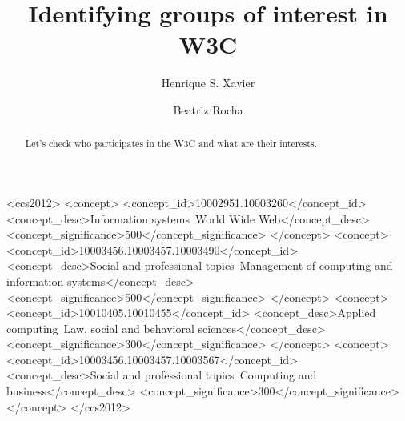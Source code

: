 \documentclass[sigconf, nonacm]{acmart}              %
\begin{document}
\title{Identifying groups of interest in W3C}

\author{Henrique S. Xavier}
\author{Beatriz Rocha}


\renewcommand{\shortauthors}{H. S. Xavier}

\begin{abstract}

Let's check who participates in the W3C and what are their interests.
  
\end{abstract}

\begin{CCSXML}
<ccs2012>
   <concept>
       <concept_id>10002951.10003260</concept_id>
       <concept_desc>Information systems~World Wide Web</concept_desc>
       <concept_significance>500</concept_significance>
       </concept>
   <concept>
       <concept_id>10003456.10003457.10003490</concept_id>
       <concept_desc>Social and professional topics~Management of computing and information systems</concept_desc>
       <concept_significance>500</concept_significance>
       </concept>
   <concept>
       <concept_id>10010405.10010455</concept_id>
       <concept_desc>Applied computing~Law, social and behavioral sciences</concept_desc>
       <concept_significance>300</concept_significance>
       </concept>
   <concept>
       <concept_id>10003456.10003457.10003567</concept_id>
       <concept_desc>Social and professional topics~Computing and business</concept_desc>
       <concept_significance>300</concept_significance>
       </concept>
 </ccs2012>
\end{CCSXML}
\end{document}
